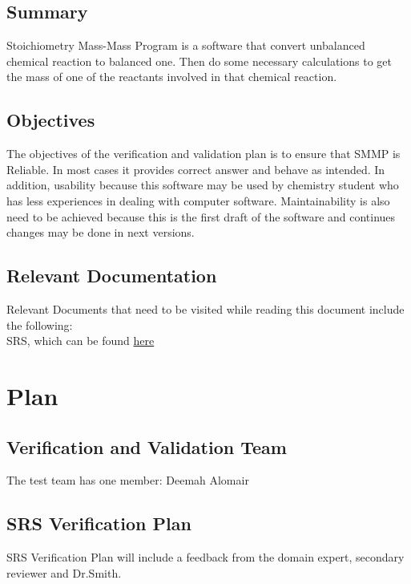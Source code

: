 \documentclass[12pt, titlepage]{article}
\begin{document}
\subsection{Summary}

Stoichiometry Mass-Mass Program is a software that convert unbalanced chemical reaction to balanced one. Then do some necessary calculations to get the mass of one of the reactants involved in that chemical reaction.

\subsection{Objectives}

The objectives of the verification and validation plan is to ensure that SMMP is Reliable. In most cases it provides correct answer and behave as intended. In addition, usability because this software may be used by chemistry student who has less experiences in dealing with computer software. Maintainability is also need to be achieved because this is the first draft of the software and continues changes may be done in next versions.

\subsection{Relevant Documentation}

Relevant Documents that need to be visited while reading this document include the following:\\

 SRS, which can be found  \href{https://github.com/deemaalomair1/CAS741_project/tree/master/docs/SRS}{here}
 
\section{Plan}
	
\subsection{Verification and Validation Team}

The test team has one member: Deemah Alomair 

\subsection{SRS Verification Plan}

SRS Verification Plan will include a feedback from the domain expert, secondary reviewer and Dr.Smith.
\end{document}
